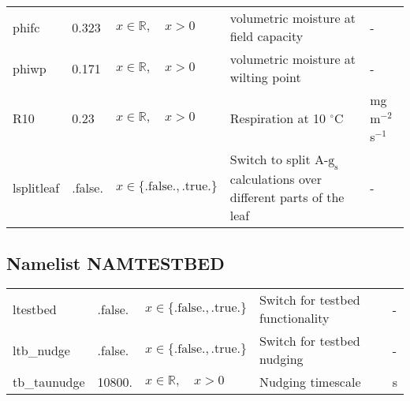 \documentclass[twoside,11pt,fleqn,a4paper,english,openright]{report}
\begin{document}
\begin{center}
\begin{supertabular}{|l|p{1.6cm}|p{3.5cm}|p{6cm}|l|}
  phifc		& 0.323	& $x \in \mathbb{R}, \quad x > 0$	& volumetric moisture at field capacity & - \\
  phiwp		& 0.171	& $x \in \mathbb{R}, \quad x > 0$	& volumetric moisture at wilting point & - \\
  R10		& 0.23	& $x \in \mathbb{R}, \quad x > 0$	& Respiration at 10 $^{\circ}$C & mg m$^{-2}$ s$^{-1}$ \\
  lsplitleaf & .false.	&  $x\in\{\text{.false.},\text{.true.}\}$  & Switch to split $\text{A-}\text{g}_\text{s}$ calculations over different parts of the leaf  & - \\
\end{supertabular}


\end{center}

\subsection{Namelist NAMTESTBED}\label{par:testbed}
\begin{center}
  \tablelasttail{
        &&&&\\\hline
  }
\begin{supertabular}{|l|p{2cm}|p{4cm}|p{6cm}|l|}
  ltestbed	& .false.	& $x\in\{\text{.false.},\text{.true.}\}$	& Switch for testbed functionality		& -\\
  ltb\_nudge	& .false.	& $x\in\{\text{.false.},\text{.true.}\}$	& Switch for testbed nudging		& -\\
  tb\_taunudge & 10800.	& $x \in \mathbb{R}, \quad x > 0$			& Nudging timescale					& s\\
\end{supertabular}
\end{center}
\end{document}

